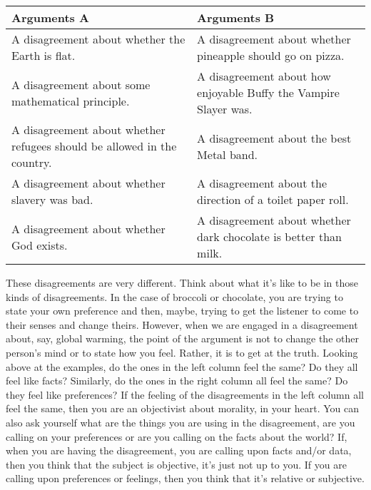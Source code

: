 \begin{tabular}{p{1.5in}|p{1.5in}}
Arguments A&Arguments B\\\hline
A disagreement about whether the Earth is flat.&A disagreement about whether pineapple should go on pizza.\\
\hline
A disagreement about some mathematical principle.&A disagreement about how enjoyable Buffy the Vampire Slayer was.\\
\hline
A disagreement about whether refugees should be allowed in the country.&A disagreement about the best Metal band.\\
\hline 
A disagreement about whether slavery was bad.&A disagreement about the direction of a toilet paper roll.\\
\hline
A disagreement about whether God exists.&A disagreement about whether dark chocolate is better than milk.\\
\end{tabular}

These disagreements are very different. Think about what it’s like to be in those kinds of disagreements. In the case of broccoli or chocolate, you are trying to state your own preference and then, maybe, trying to get the listener to come to their senses and change theirs. However, when we are engaged in a disagreement about, say, global warming, the point of the argument is not to change the other person’s mind or to state how you feel. Rather, it is to get at the truth. Looking above at the examples, do the ones in the left column feel the same? Do they all feel like facts? Similarly, do the ones in the right column all feel the same? Do they feel like preferences? If the feeling of the disagreements in the left column all feel the same, then you are an objectivist about morality, in your heart. You can also ask yourself what are the things you are using in the disagreement, are you calling on your preferences or are you calling on the facts about the world? If, when you are having the disagreement, you are calling upon facts and/or data, then you think that the subject is objective, it's just not up to you. If you are calling upon preferences or feelings, then you think that it's relative or subjective. 

